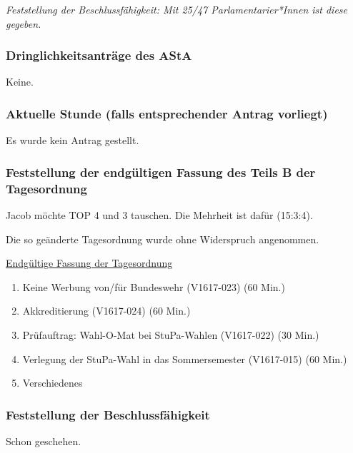 \documentclass[ngerman,headheight=70pt]{scrartcl}
\begin{document}
    \textit{Feststellung der Beschlussfähigkeit: Mit 25/47 Parlamentarier*Innen
    ist diese gegeben.}

    \subsubsection{Dringlichkeitsanträge des AStA}

    Keine.

    \subsubsection{Aktuelle Stunde (falls entsprechender Antrag vorliegt)}

    Es wurde kein Antrag gestellt.

    \subsubsection{Feststellung der endgültigen Fassung des Teils B der Tagesordnung}

    Jacob möchte TOP 4 und 3 tauschen. Die Mehrheit ist dafür (15:3:4).

    Die so geänderte Tagesordnung wurde ohne Widerspruch angenommen.

    \underline{Endgültige Fassung der Tagesordnung}
    \begin{enumerate}[label={\textbf{Top \theenumi}},leftmargin=*]
        \item Keine Werbung von/für Bundeswehr (V1617-023) (60 Min.)
        \item Akkreditierung (V1617-024) (60 Min.)
        \item Prüfauftrag: Wahl-O-Mat bei StuPa-Wahlen (V1617-022) (30 Min.)
        \item Verlegung der StuPa-Wahl in das Sommersemester (V1617-015) (60 Min.)
        \item Verschiedenes
    \end{enumerate}

    \subsubsection{Feststellung der Beschlussfähigkeit}

    Schon geschehen.
\end{document}
